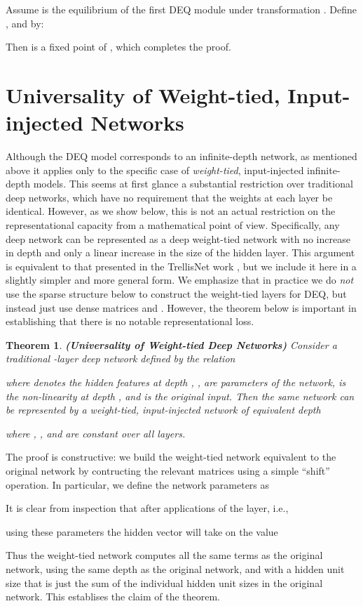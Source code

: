 \documentclass{article}
\newtheorem{apptheorem}{Theorem}
\newenvironment{proofidx}[1]{\renewcommand{\proofname}{Proof of Theorem #1}\proof}{\endproof}
\begin{document}
\begin{proofidx}{\ref{thm:stack-deq}}
Assume  is the equilibrium of the first DEQ module under transformation . Define , and  by:

Then  is a fixed point of , which completes the proof.
\end{proofidx}

\section{Universality of Weight-tied, Input-injected Networks}
\label{app:weight-tied}

Although the DEQ model corresponds to an infinite-depth network, as mentioned above it applies only to the specific case of \emph{weight-tied}, input-injected infinite-depth models.  This seems at first glance a substantial restriction over traditional deep networks, which have no requirement that the weights at each layer be identical.  However, as we show below, this is not an actual restriction on the representational capacity from a mathematical point of view. Specifically, any deep network can be represented as a deep weight-tied network with no increase in depth and only a linear increase in the size of the hidden layer.  This argument is equivalent to that presented in the TrellisNet work \cite[Theorem 1]{bai2018trellis}, but we include it here in a slightly simpler and more general form.  We emphasize that in practice we do \emph{not} use the sparse structure below to construct the weight-tied layers for DEQ, but instead just use dense matrices  and .  However, the theorem below is important in establishing that there is no notable representational loss.

\begin{apptheorem}
\label{thm:weight-tied}
\textbf{(Universality of Weight-tied Deep Networks)}  Consider a traditional -layer deep network defined by the relation

where  denotes the hidden features at depth , ,  are parameters of the network,  is the non-linearity at depth , and  is the original input.  Then the same network can be represented by a weight-tied, input-injected network of equivalent depth

where , ,  and  are constant over all layers.
\end{apptheorem}

\begin{proofidx}{\ref{thm:weight-tied}}
The proof is constructive: we build the weight-tied network equivalent to the original network by contructing the relevant matrices using a simple ``shift'' operation.  In particular, we define the network parameters as

It is clear from inspection that after  applications of the layer, i.e.,

using these parameters the hidden vector  will take on the value

Thus the weight-tied network computes all the same terms as the original network, using the same depth as the original network, and with a hidden unit size that is just the sum of the individual hidden unit sizes in the original network.  This establises the claim of the theorem.
\end{proofidx}
\end{document}

